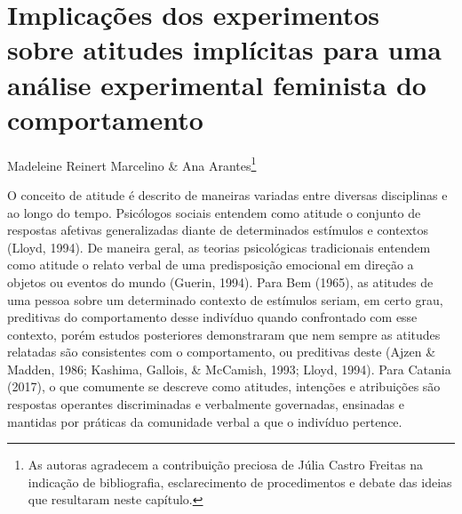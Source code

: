 \chapter{Implicações dos experimentos sobre atitudes implícitas para uma análise experimental feminista do comportamento}
\begin{flushright}
\begin{scriptsize}
    Madeleine Reinert Marcelino \& Ana Arantes\footnote{As autoras agradecem a contribuição preciosa de Júlia Castro Freitas na indicação de bibliografia, esclarecimento de procedimentos e debate das ideias que resultaram neste capítulo.}
\end{scriptsize}
\vspace{1cm}
\end{flushright}

O conceito de atitude é descrito de maneiras variadas entre diversas disciplinas e ao longo do tempo. Psicólogos sociais entendem como atitude o conjunto de respostas afetivas generalizadas diante de determinados estímulos e contextos (Lloyd, 1994). De maneira geral, as teorias psicológicas tradicionais entendem como atitude o relato verbal de uma predisposição emocional em direção a objetos ou eventos do mundo (Guerin, 1994). Para Bem (1965), as atitudes de uma pessoa sobre um determinado contexto de estímulos seriam, em certo grau, preditivas do comportamento desse indivíduo quando confrontado com esse contexto, porém estudos posteriores demonstraram que nem sempre as atitudes relatadas são consistentes com o comportamento, ou preditivas deste (Ajzen \& Madden, 1986; Kashima, Gallois, \& McCamish, 1993; Lloyd, 1994). Para Catania (2017), o que comumente se descreve como atitudes, intenções e atribuições são respostas operantes discriminadas e verbalmente governadas, ensinadas e mantidas por práticas da comunidade verbal a que o indivíduo pertence.

